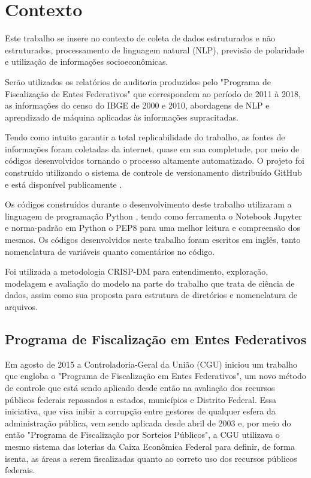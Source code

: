 \chapter{Contexto}
\label{cap:contexto}

Este trabalho se insere no contexto de coleta de dados estruturados e não estruturados, processamento de linguagem natural (NLP), previsão de polaridade e utilização de informações socioeconômicas.

Serão utilizados os relatórios de auditoria produzidos pelo "Programa de Fiscalização de Entes Federativos" que correspondem ao período de 2011 à 2018, as informações do censo do IBGE de 2000 e 2010, abordagens de NLP e aprendizado de máquina aplicadas às informações supracitadas.

Tendo como intuito garantir a total replicabilidade do trabalho, as fontes de informações foram coletadas da internet, quase em sua completude, por meio de códigos desenvolvidos tornando o processo altamente automatizado. O projeto foi construído utilizando o sistema de controle de versionamento distribuído GitHub e está disponível publicamente \cite{GitHubLucas}.

Os códigos construídos durante o desenvolvimento deste trabalho utilizaram a linguagem de programação Python \cite{Python}, tendo como ferramenta o Notebook Jupyter \cite{JupyterNotebook} e norma-padrão em Python o PEP8 \cite{PEP8} para uma melhor leitura e compreensão dos mesmos. Os códigos desenvolvidos neste trabalho foram escritos em inglês, tanto nomenclatura de variáveis quanto comentários no código.

Foi utilizada a metodologia CRISP-DM \cite{CRISPDM} para entendimento, exploração, modelagem e avaliação do modelo na parte do trabalho que trata de ciência de dados, assim como sua proposta para estrutura de diretórios e nomenclatura de arquivos.

\section{Programa de Fiscalização em Entes Federativos}
\label{sec:programa_de_fiscalizacao_em_entes_federativos}

Em agosto de 2015 a Controladoria-Geral da União (CGU) iniciou um trabalho que engloba o "Programa de Fiscalização em Entes Federativos", um novo método de controle que está sendo aplicado desde então na avaliação dos recursos públicos federais repassados a estados, municípios e Distrito Federal. Essa iniciativa, que visa inibir a corrupção entre gestores de qualquer esfera da administração pública, vem sendo aplicada desde abril de 2003 e, por meio do então "Programa de Fiscalização por Sorteios Públicos", a CGU utilizava o mesmo sistema das loterias da Caixa Econômica Federal para definir, de forma isenta, as áreas a serem fiscalizadas quanto ao correto uso dos recursos públicos federais.

